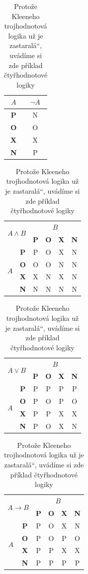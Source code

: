 \documentclass[a4paper, 11pt]{article}
\providecommand{\uv}[1]{\quotedblbase #1\textquotedblleft}
\begin{document}
		\begin{table}[ht]
		\begin{center}	
			\begin{tabular}{|c|c|}
				\hline
				$A$ & $\neg A$ \\ \hline
				\textbf{P} & N \\ \hline
				\textbf{O} & O \\ \hline
				\textbf{X} & X \\ \hline
				\textbf{N} & P \\ \hline
			\end{tabular}
			\begin{tabular}{|c|c|c|c|c|c|} \hline
				\multicolumn{2}{|c|}{\multirow{2}{*}{$A \land B$}} & \multicolumn{4}{c|}{$B$}\\ \cline{3-6}
				\multicolumn{2}{|c|}{} & \textbf{P} & \textbf{O} & \textbf{X} & \textbf{N} \\ \hline
				\multirow{4}{*}{$A$} & \textbf{P} & P & O & X & N \\ \cline{2-6}
				& \textbf{O} & O & O & N & N \\ \cline{2-6}
				& \textbf{X} & X & N & X & N \\ \cline{2-6}
				& \textbf{N} & N & N & N & N \\ \hline
			\end{tabular}
			\begin{tabular}{|c|c|c|c|c|c|} \hline
				\multicolumn{2}{|c|}{\multirow{2}{*}{$A \lor B$}} & \multicolumn{4}{c|}{$B$}\\ \cline{3-6}
				\multicolumn{2}{|c|}{} & \textbf{P} & \textbf{O} & \textbf{X} & \textbf{N} \\ \hline
				\multirow{4}{*}{$A$} & \textbf{P} & P & P & P & P \\ \cline{2-6}
				& \textbf{O} & P & O & P & O \\ \cline{2-6}
				& \textbf{X} & P & P & X & X \\ \cline{2-6}
				& \textbf{N} & P & O & X & N \\ \hline
			\end{tabular}
			\begin{tabular}{|c|c|c|c|c|c|} \hline
				\multicolumn{2}{|c|}{\multirow{2}{*}{$A \rightarrow B$}} & \multicolumn{4}{c|}{$B$}\\ \cline{3-6}
				\multicolumn{2}{|c|}{} & \textbf{P} & \textbf{O} & \textbf{X} & \textbf{N} \\ \hline
				\multirow{4}{*}{$A$} & \textbf{P} & P & O & X & N \\ \cline{2-6}
				& \textbf{O} & P & O & P & O \\ \cline{2-6}
				& \textbf{X} & P & P & X & X \\ \cline{2-6}
				& \textbf{N} & P & P & P & P \\ \hline
			\end{tabular}
		\caption{Protože Kleeneho trojhodnotová logika už je \uv{zastaralá}, uvádíme si zde příklad čtyřhodnotové logiky}
		\label{tab:Logic}
		\end{center}
		\end{table}
\end{document}
